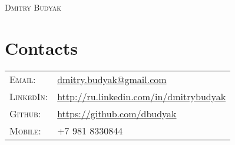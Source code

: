 \documentclass[a4paper,11pt]{article}
\begin{document}
\pagestyle{empty}
\par{\centering
	\Large \textsc{Dmitry Budyak}
	}\bigskip\par

\section{Contacts}
	\begin{tabular}{ll}
	\textsc{Email:}     	& \href{mailto:dmitry.budyak@gmail.com}{dmitry.budyak@gmail.com} \\
	\textsc{LinkedIn:} 	& \href{http://ru.linkedin.com/in/dmitrybudyak}{http://ru.linkedin.com/in/dmitrybudyak} \\
	\textsc{Github:}	& \href{https://github.com/dbudyak}{https://github.com/dbudyak} \\
	\textsc{Mobile:}     	& +7 981 8330844
	\end{tabular}
\end{document}
